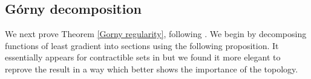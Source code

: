 \documentclass[reqno,10pt]{amsart}
\newcommand{\RR}{\mathbf{R}}
\newcommand*\dif{\mathop{}\!\mathrm{d}}
\theoremstyle{definition}
\numberwithin{equation}{section}
\begin{document}


\subsection{G\'orny decomposition}
We next prove Theorem \ref{Gorny regularity}, following \cite[\S3]{górny2017planar}.
We begin by decomposing functions of least gradient into sections using the following proposition.
It essentially appears for contractible sets in \cite[pg10-11]{górny2017planar} but we found it more elegant to reprove the result in a way which better shows the importance of the topology.
\end{document}
